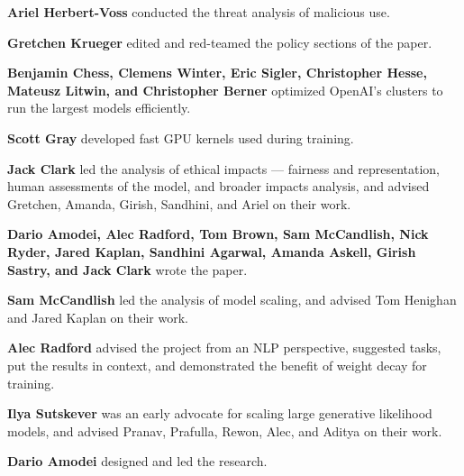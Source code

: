 \textbf{Ariel Herbert-Voss} conducted the threat analysis of malicious use.

\textbf{Gretchen Krueger} edited and red-teamed the policy sections of the paper.

\textbf{Benjamin Chess, Clemens Winter, Eric Sigler, Christopher Hesse, Mateusz Litwin, and Christopher Berner} optimized OpenAI’s clusters to run the largest models efficiently.

\textbf{Scott Gray} developed fast GPU kernels used during training.

\textbf{Jack Clark} led the analysis of ethical impacts — fairness and representation, human assessments of the model, and broader impacts analysis, and advised Gretchen, Amanda, Girish, Sandhini, and Ariel on their work.

\textbf{Dario Amodei, Alec Radford, Tom Brown, Sam McCandlish, Nick Ryder, Jared Kaplan, Sandhini Agarwal, Amanda Askell, Girish Sastry, and Jack Clark} wrote the paper.

\textbf{Sam McCandlish} led the analysis of model scaling, and advised Tom Henighan and Jared Kaplan on their work.

\textbf{Alec Radford} advised the project from an NLP perspective, suggested tasks, put the results in context, and demonstrated the benefit of weight decay for training.

\textbf{Ilya Sutskever} was an early advocate for scaling large generative likelihood models, and advised Pranav, Prafulla, Rewon, Alec, and Aditya on their work.

\textbf{Dario Amodei} designed and led the research.
